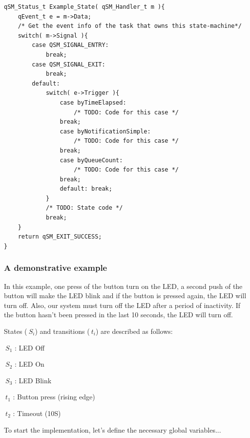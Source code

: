 \documentclass{article}
\begin{document}
\begin{lstlisting}[style=CStyle]
qSM_Status_t Example_State( qSM_Handler_t m ){
    qEvent_t e = m->Data; 
    /* Get the event info of the task that owns this state-machine*/
    switch( m->Signal ){
        case QSM_SIGNAL_ENTRY:
            break;
        case QSM_SIGNAL_EXIT:
            break;
        default:
            switch( e->Trigger ){
                case byTimeElapsed:
                    /* TODO: Code for this case */
                break;
                case byNotificationSimple:
                    /* TODO: Code for this case */
                break;
                case byQueueCount:
                    /* TODO: Code for this case */
                break;
                default: break;
            }
            /* TODO: State code */
            break;
    }
    return qSM_EXIT_SUCCESS;
}
\end{lstlisting}

\subsubsection{A demonstrative example} \label{fsm_example}
In this example, one press of the button turn on the LED, a second push of the button will make the LED blink and if the button is pressed again, the LED will turn off. Also, our system must turn off the LED after a period of inactivity. If the button hasn't been pressed in the last 10 seconds, the LED will turn off. 

States ($\ S_i$) and transitions ($\ t_i$) are described as follows: \\
\begin{itemize}
\begin{minipage}{0.4\linewidth}
    \item $\ S_1$ : LED Off
    \item $\ S_2$ : LED On
    \item $\ S_3$ : LED Blink
\end{minipage}
\begin{minipage}{0.4\linewidth}
    \item $\ t_1$ : Button press (rising edge)
    \item $\ t_2$ : Timeout (10S)
\end{minipage}
\end{itemize}



To start the implementation, let's define the necessary global variables...
\end{document}
